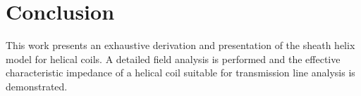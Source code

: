 \section{Conclusion}\label{sec:conclusion}
This work presents an exhaustive derivation and presentation of the sheath helix model for helical coils. A detailed field analysis is performed and the effective characteristic impedance of a helical coil suitable for transmission line analysis is demonstrated. 